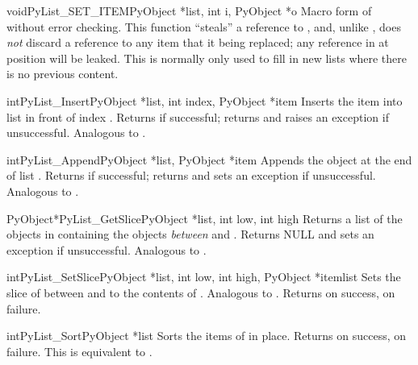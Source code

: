 \documentclass{manual}
\begin{document}
\begin{cfuncdesc}{void}{PyList_SET_ITEM}{PyObject *list, int i,
                                              PyObject *o}
Macro form of  without error checking.
  This function ``steals'' a reference to ,
and, unlike , does \emph{not} discard a
reference to any item that it being replaced; any reference in
 at position  will be leaked.  This is normally only
used to fill in new lists where there is no previous content.
\end{cfuncdesc}

\begin{cfuncdesc}{int}{PyList_Insert}{PyObject *list, int index,
                                      PyObject *item}
Inserts the item  into list  in front of index
.  Returns  if successful; returns  and
raises an exception if unsuccessful.  Analogous to
.
\end{cfuncdesc}

\begin{cfuncdesc}{int}{PyList_Append}{PyObject *list, PyObject *item}
Appends the object  at the end of list .  Returns
 if successful; returns  and sets an exception if
unsuccessful.  Analogous to .
\end{cfuncdesc}

\begin{cfuncdesc}{PyObject*}{PyList_GetSlice}{PyObject *list,
                                              int low, int high}
Returns a list of the objects in  containing the objects 
\emph{between}  and .  Returns NULL and sets an
exception if unsuccessful.
Analogous to .
\end{cfuncdesc}

\begin{cfuncdesc}{int}{PyList_SetSlice}{PyObject *list,
                                        int low, int high,
                                        PyObject *itemlist}
Sets the slice of  between  and  to the
contents of .  Analogous to
.  Returns
 on success,  on failure.
\end{cfuncdesc}

\begin{cfuncdesc}{int}{PyList_Sort}{PyObject *list}
Sorts the items of  in place.  Returns  on success,
 on failure.  This is equivalent to
.
\end{cfuncdesc}
\end{document}
